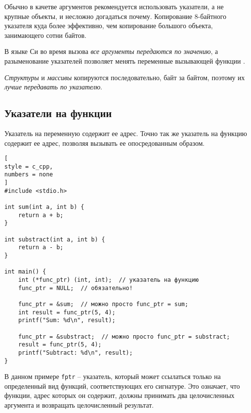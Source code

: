 \documentclass[%
	11pt,
	a4paper,
	utf8,
		]{article}
\begin{document}
Обычно в качетве аргументов рекомендуется использовать указатели, а не крупные объекты, и несложно догадаться почему. Копирование 8-байтного указателя куда более эффективно, чем копирование большого объекта, занимающего сотни байтов.

В языке Си во время вызова \emph{все аргументы передаются по значению}, а разыменование указателей позволяет менять переменные вызывающей функции \cite[]{amini-extreme-c:2022}.

\emph{Структуры} и \emph{массивы} копируются последовательно, байт за байтом, поэтому их \emph{лучше передавать по указателю}.

\subsection{Указатели на функции}

Указатель на переменную содержит ее адрес. Точно так же указатель на функцию содержит ее адрес, позволяя вызывать ее опосредованным образом. 
\begin{lstlisting}[
style = c_cpp,
numbers = none
]
#include <stdio.h>

int sum(int a, int b) {
    return a + b;
}

int substract(int a, int b) {
    return a - b;
}

int main() {
    int (*func_ptr) (int, int);  // указатель на функцию
    func_ptr = NULL;  // обязательно!
    
    func_ptr = &sum;  // можно просто func_ptr = sum;
    int result = func_ptr(5, 4);
    printf("Sum: %d\n", result);
    
    func_ptr = &substract;  // можно просто func_ptr = substract;
    result = func_ptr(5, 4);
    printf("Subtract: %d\n", result);
}
\end{lstlisting}

В данном примере \verb|fptr| -- указатель, который может ссылаться только на определенный вид функций, соответствующих его сигнатуре. Это означает, что функции, адрес которых он содержит, должны принимать два целочисленных аргумента и возвращать целочисленный результат.
\end{document}
